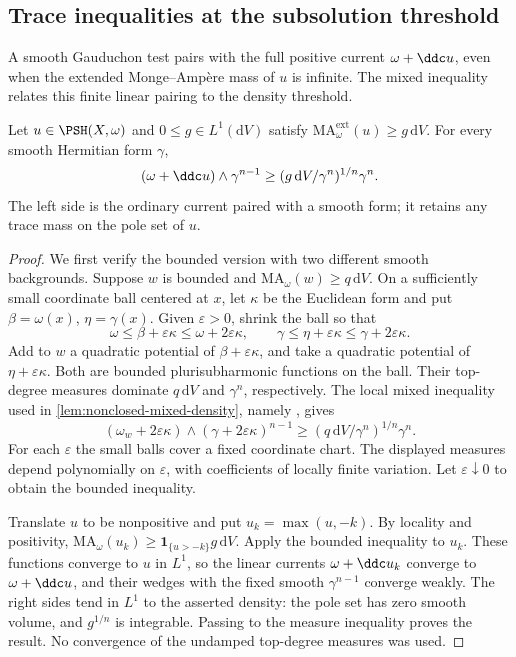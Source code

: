 \subsection{Trace inequalities at the subsolution threshold}

A smooth Gauduchon test pairs with the full positive current $\omega+\ddc u$, even when the extended Monge--Amp\`ere mass of $u$ is infinite. The mixed inequality relates this finite linear pairing to the density threshold.

\begin{lemma}\label{lem:unbounded-gauduchon-trace-density}
Let $u\in\PSH(X,\omega)$ and $0\leq g\in L^1(\mathrm{d}V)$ satisfy
$\mathrm{MA}^{\mathrm{ext}}_\omega(u)\geq g\,\mathrm{d}V$. For every smooth Hermitian form $\gamma$,
\[
 (\omega+\ddc u)\wedge\gamma^{n-1}
       \geq(g\,\mathrm{d}V/\gamma^n)^{1/n}\gamma^n.
\]
The left side is the ordinary current paired with a smooth form; it retains any trace mass on the pole set of $u$.
\end{lemma}
\begin{proof}
We first verify the bounded version with two different smooth backgrounds. Suppose $w$ is bounded and $\mathrm{MA}_\omega(w)\geq q\,\mathrm{d}V$. On a sufficiently small coordinate ball centered at $x$, let $\kappa$ be the Euclidean form and put $\beta=\omega(x)$, $\eta=\gamma(x)$. Given $\varepsilon>0$, shrink the ball so that
\[
 \omega\leq\beta+\varepsilon\kappa\leq\omega+2\varepsilon\kappa,
 \qquad
 \gamma\leq\eta+\varepsilon\kappa\leq\gamma+2\varepsilon\kappa.
\]
Add to $w$ a quadratic potential of $\beta+\varepsilon\kappa$, and take a quadratic potential of $\eta+\varepsilon\kappa$. Both are bounded plurisubharmonic functions on the ball. Their top-degree measures dominate $q\,\mathrm{d}V$ and $\gamma^n$, respectively. The local mixed inequality used in \cref{lem:nonclosed-mixed-density}, namely \cite[Theorem 1.2]{Dinew09}, gives
\[
 (\omega_w+2\varepsilon\kappa)\wedge
             (\gamma+2\varepsilon\kappa)^{n-1}
 \geq(q\,\mathrm{d}V/\gamma^n)^{1/n}\gamma^n.
\]
For each $\varepsilon$ the small balls cover a fixed coordinate chart. The displayed measures depend polynomially on $\varepsilon$, with coefficients of locally finite variation. Let $\varepsilon\downarrow0$ to obtain the bounded inequality.

Translate $u$ to be nonpositive and put $u_k=\max(u,-k)$. By locality and positivity,
$\mathrm{MA}_\omega(u_k)\geq\mathbf1_{\{u>-k\}}g\,\mathrm{d}V$. Apply the bounded inequality to $u_k$. These functions converge to $u$ in $L^1$, so the linear currents $\omega+\ddc u_k$ converge to $\omega+\ddc u$, and their wedges with the fixed smooth $\gamma^{n-1}$ converge weakly. The right sides tend in $L^1$ to the asserted density: the pole set has zero smooth volume, and $g^{1/n}$ is integrable. Passing to the measure inequality proves the result. No convergence of the undamped top-degree measures was used.
\end{proof}

